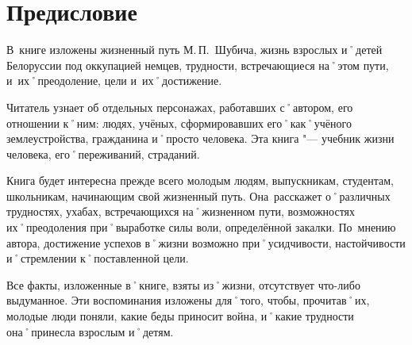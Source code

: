 ﻿\chapter{Предисловие}
В~книге изложены жизненный путь М.\,П.~Шубича, жизнь взрослых и˚детей Белоруссии под оккупацией немцев, трудности, встречающиеся на˚этом пути, и~их˚преодоление, цели и~их˚достижение.

Читатель узнает об отдельных персонажах, работавших с˚автором, его отношении к˚ним: людях, учёных, сформировавших его˚как˚учёного землеустройства, гражданина и˚просто человека. Эта книга "--- учебник жизни человека, его˚переживаний, страданий.

Книга будет интересна прежде всего молодым людям, выпускникам, студентам, школьникам, начинающим свой жизненный путь. Она~расскажет о˚различных трудностях, ухабах, встречающихся на˚жизненном пути, возможностях их˚преодоления при˚выработке силы воли, определённой закалки. По~мнению автора, достижение успехов в˚жизни возможно при˚усидчивости, настойчивости и˚стремлении к˚поставленной цели.

Все факты, изложенные в˚книге, взяты из˚жизни, отсутствует что-либо выдуманное. Эти воспоминания изложены для˚того, чтобы, прочитав˚их, молодые люди поняли, какие беды приносит война, и˚какие трудности она˚принесла взрослым и˚детям.
